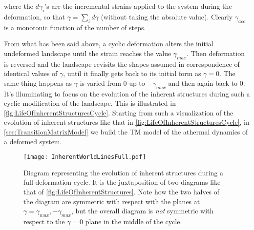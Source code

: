 where the $d\gamma_{i}$'s are the incremental strains applied to the system during the deformation, so that $\gamma = \sum_{i} d\gamma$ (without taking the absolute value). Clearly $\gamma_{acc}$ is a monotonic function of the number of steps.
 
From what has been said above, a cyclic deformation alters the initial undeformed landscape until the strain reaches the value $\gamma_{max}$. Then deformation is reversed and the landscape revisits the shapes assumed in correspondence of identical values of $\gamma$, until it finally gets back to its initial form as $\gamma = 0$. The same thing happens as $\gamma$ is varied from 0 up to $-\gamma_{max}$ and then again back to $0$. It's illuminating to focus on the evolution of the inherent structures during such a cyclic modification of the landscape. This is illustrated in \autoref{fig:LifeOfInherentStructuresCycle}. Starting from such a visualization of the evolution of inherent structures like that in \autoref{fig:LifeOfInherentStructuresCycle}, in \autoref{sec:TransitionMatrixModel} we build the TM model of the athermal dynamics of a deformed system.

\begin{figure}[!h] 
\centering 
\texttt{[image: InherentWorldLinesFull.pdf]} 
\caption{Diagram representing the evolution of inherent structures during a full deformation cycle. It is the juxtaposition of two diagrams like that of \autoref{fig:LifeOfInherentStructures}. Note how the two halves of the diagram are symmetric with respect with the planes at $\gamma = \gamma_{max}, -\gamma_{max}$, but the overall diagram is \emph{not} symmetric with respect to the $\gamma = 0$ plane in the middle of the cycle. \label{fig:LifeOfInherentStructuresCycle}}
\end{figure}

